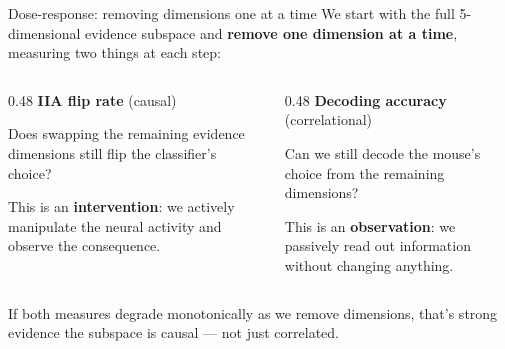 \documentclass[aspectratio=169,11pt]{beamer}
\begin{document}
\begin{frame}{Dose-response: removing dimensions one at a time}
{\small We start with the full 5-dimensional evidence subspace and \textbf{remove one dimension at a time}, measuring two things at each step:}

\vspace{0.5em}
\begin{columns}[T]
\begin{column}{0.48\textwidth}
\textbf{\textcolor{evidence}{IIA flip rate}} {\small (causal)}

\vspace{0.2em}
{\small Does swapping the remaining evidence dimensions still flip the classifier's choice?}

\vspace{0.2em}
{\small This is an \textbf{intervention}: we actively manipulate the neural activity and observe the consequence.}
\end{column}
\begin{column}{0.48\textwidth}
\textbf{\textcolor{choice}{Decoding accuracy}} {\small (correlational)}

\vspace{0.2em}
{\small Can we still decode the mouse's choice from the remaining dimensions?}

\vspace{0.2em}
{\small This is an \textbf{observation}: we passively read out information without changing anything.}
\end{column}
\end{columns}

\vspace{0.5em}
{\small If both measures degrade monotonically as we remove dimensions, that's strong evidence the subspace is causal --- not just correlated.}
\end{frame}
\end{document}
